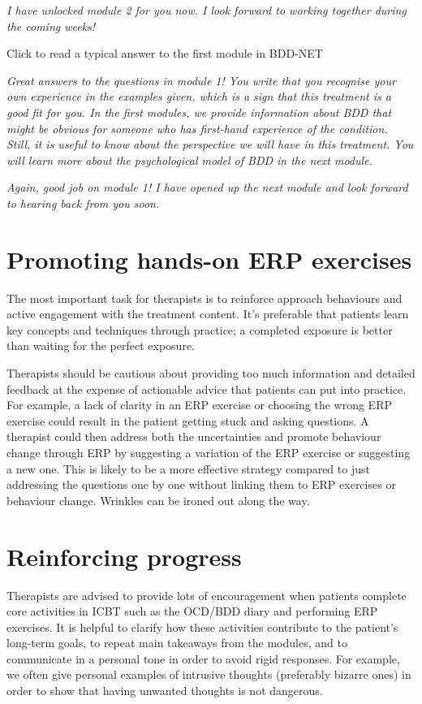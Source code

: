 \documentclass[]{book}
\begin{document}
\emph{I have unlocked module 2 for you now. I look forward to working together during the coming weeks!}

 Click to read a typical answer to the first module in BDD-NET

\emph{Great answers to the questions in module 1! You write that you recognise your own experience in the examples given, which is a sign that this treatment is a good fit for you. In the first modules, we provide information about BDD that might be obvious for someone who has first-hand experience of the condition. Still, it is useful to know about the perspective we will have in this treatment. You will learn more about the psychological model of BDD in the next module.}

\emph{Again, good job on module 1! I have opened up the next module and look forward to hearing back from you soon.}

\hypertarget{promoting-hands-on-erp-exercises}{%
\section{Promoting hands-on ERP exercises}\label{promoting-hands-on-erp-exercises}}

The most important task for therapists is to reinforce approach behaviours and active engagement with the treatment content. It's preferable that patients learn key concepts and techniques through practice; a completed exposure is better than waiting for the perfect exposure.

Therapists should be cautious about providing too much information and detailed feedback at the expense of actionable advice that patients can put into practice. For example, a lack of clarity in an ERP exercise or choosing the wrong ERP exercise could result in the patient getting stuck and asking questions. A therapist could then address both the uncertainties and promote behaviour change through ERP by suggesting a variation of the ERP exercise or suggesting a new one. This is likely to be a more effective strategy compared to just addressing the questions one by one without linking them to ERP exercises or behaviour change. Wrinkles can be ironed out along the way.

\hypertarget{reinforcing-progress}{%
\section{Reinforcing progress}\label{reinforcing-progress}}

Therapists are advised to provide lots of encouragement when patients complete core activities in ICBT such as the OCD/BDD diary and performing ERP exercises. It is helpful to clarify how these activities contribute to the patient's long-term goals, to repeat main takeaways from the modules, and to communicate in a personal tone in order to avoid rigid responses. For example, we often give personal examples of intrusive thoughts (preferably bizarre ones) in order to show that having unwanted thoughts is not dangerous.
\end{document}
